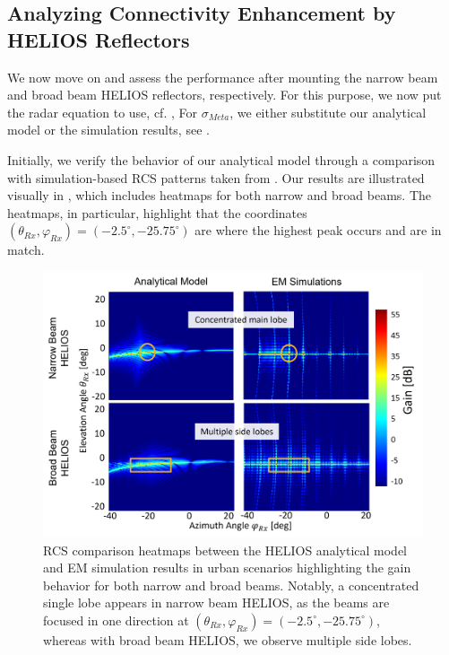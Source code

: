 \subsection{Analyzing Connectivity Enhancement by HELIOS Reflectors}\label{Coupling Simulated and Analytical Reflection Pattern with Radar Realization}
We now move on and assess the performance after mounting the narrow beam and broad beam HELIOS reflectors, respectively. For this purpose, we now put the radar equation to use, cf. , For $\sigma_{Meta}$, we either substitute our analytical model or the simulation results, see .

Initially, we verify the behavior of our analytical model through a comparison with simulation-based RCS patterns taken from \cite{Helios}. Our results are illustrated visually in  , which includes heatmaps for both narrow and broad beams. The heatmaps, in particular, highlight that the coordinates $(\theta_{Rx}, \varphi_{Rx})=(\num{-2.5}^\circ, \num{-25.75}^\circ)$ are where the highest peak occurs and are in match.
\begin{figure}[H]
	\centering
	\includegraphics[width=0.9\linewidth]{images/Section 4 Images/urbanscenario_analy_sim}
	\caption{RCS comparison heatmaps between the HELIOS analytical model and EM simulation results in urban scenarios highlighting the gain behavior for both narrow and broad beams. Notably, a concentrated single lobe appears in narrow beam HELIOS, as the beams are focused in one direction at $(\theta_{Rx}, \varphi_{Rx})=(\num{-2.5}^\circ, \num{-25.75}^\circ)$, whereas with broad beam HELIOS, we observe multiple side lobes.}
	\label{fig:urbanscenario_analy_sim}
\end{figure}
